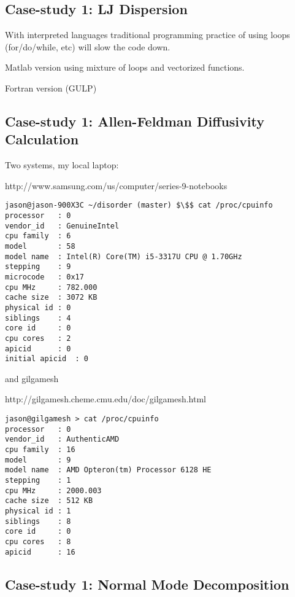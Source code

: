 \subsection{Case-study 1: LJ Dispersion}

With interpreted languages traditional programming practice of using 
loops (for/do/while, etc) will slow the code down.  

Matlab version using mixture of loops and vectorized functions.

Fortran version (GULP) 

\subsection{Case-study 1: Allen-Feldman Diffusivity Calculation}

Two systems, my local laptop:

http://www.samsung.com/us/computer/series-9-notebooks

\lstset{language=Shell}
\begin{lstlisting}[label=some-code,caption=Some Code]
jason@jason-900X3C ~/disorder (master) $\$$ cat /proc/cpuinfo 
processor	: 0
vendor_id	: GenuineIntel
cpu family	: 6
model		: 58
model name	: Intel(R) Core(TM) i5-3317U CPU @ 1.70GHz
stepping	: 9
microcode	: 0x17
cpu MHz		: 782.000
cache size	: 3072 KB
physical id	: 0
siblings	: 4
core id		: 0
cpu cores	: 2
apicid		: 0
initial apicid	: 0
\end{lstlisting}


and gilgamesh

http://gilgamesh.cheme.cmu.edu/doc/gilgamesh.html

\lstset{language=Shell}
\begin{lstlisting}[label=some-code,caption=Some Code]
jason@gilgamesh > cat /proc/cpuinfo
processor	: 0
vendor_id	: AuthenticAMD
cpu family	: 16
model		: 9
model name	: AMD Opteron(tm) Processor 6128 HE
stepping	: 1
cpu MHz		: 2000.003
cache size	: 512 KB
physical id	: 1
siblings	: 8
core id		: 0
cpu cores	: 8
apicid		: 16
\end{lstlisting}

\subsection{Case-study 1: Normal Mode Decomposition}

